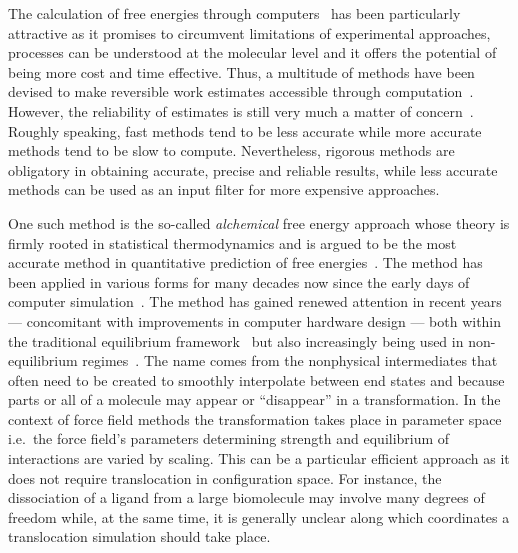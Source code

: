 \documentclass[journal=jctcce,manuscript=article]{achemso}
\begin{document}
The calculation of free energies through
computers~\cite{hansen_practical_2014, doi:10.1021/jp102971x,
  Gallicchio201127, doi:10.1080/08927022.2015.1132317,
  doi:10.1146/annurev.matsci.32.111901.153708} has been particularly
attractive as it promises to circumvent limitations of experimental
approaches, processes can be understood at the molecular level and it
offers the potential of being more cost and time effective.  Thus, a
multitude of methods have been devised to make reversible work
estimates accessible through computation~\cite{hansen_practical_2014,
  doi:10.1021/jp102971x, Gallicchio201127,
  doi:10.1080/08927022.2015.1132317,
  doi:10.1146/annurev.matsci.32.111901.153708}.  However, the
reliability of estimates is still very much a matter of
concern~\cite{doi:10.1021/jp102971x, doi:10.1021/acs.jctc.5b00179}.
Roughly speaking, fast methods tend to be less accurate while more
accurate methods tend to be slow to compute.  Nevertheless, rigorous
methods are obligatory in obtaining accurate, precise and reliable
results, while less accurate methods can be used as an input filter
for more expensive approaches.

One such method is the so-called \emph{alchemical} free energy
approach whose theory is firmly rooted in statistical thermodynamics
and is argued to be the most accurate method in quantitative
prediction of free energies~\cite{Beveridge-citeulike:3789890,
  straatsma:92, doi:10.1021/cr00023a004, hansen_practical_2014}.  The
method has been applied in various forms for many decades now since
the early days of computer simulation~\cite{doi:10.1063/1.1671118,
  bennett_efficient_1976, doi:10.1063/1.432264, FS9821700055,
  Tembe1984281, doi:10.1063/1.449208}.  The method has gained renewed
attention in recent years --- concomitant with improvements in
computer hardware design --- both within the traditional equilibrium
framework~\cite{GILSON19971047, doi:10.1021/jp0217839,
  deng_computations_2009} but also increasingly being used in
non-equilibrium regimes~\cite{ytreberg_comparison_2006, JCC:JCC23804,
  doi:10.1021/ct500964e}.  The name comes from the nonphysical
intermediates that often need to be created to smoothly interpolate
between end states and because parts or all of a molecule may appear
or ``disappear'' in a transformation.  In the context of force field
methods the transformation takes place in parameter space i.e.\ the
force field's parameters determining strength and equilibrium of
interactions are varied by scaling.  This can be a particular
efficient approach as it does not require translocation in
configuration space.  For instance, the dissociation of a ligand from
a large biomolecule may involve many degrees of freedom while, at the
same time, it is generally unclear along which coordinates a
translocation simulation should take place.
\end{document}
